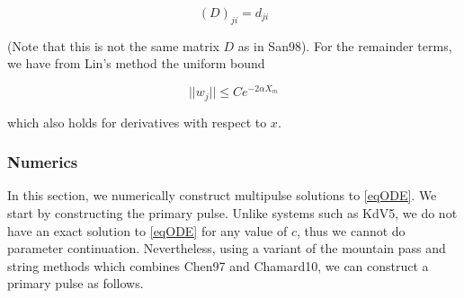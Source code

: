 \documentclass[12pt]{article}
\begin{document}
\begin{equation}\label{matrixD}
(D)_{ji} = d_{ji}
\end{equation}

(Note that this is not the same matrix $D$ as in San98). For the remainder terms, we have from Lin's method the uniform bound

\begin{equation}\label{sjwbound}
||w_j|| \leq C e^{-2 \alpha X_m}
\end{equation}

which also holds for derivatives with respect to $x$.

\subsubsection{Numerics}

In this section, we numerically construct multipulse solutions to \eqref{eqODE}. We start by constructing the primary pulse. Unlike systems such as KdV5, we do not have an exact solution to \eqref{eqODE} for any value of $c$, thus we cannot do parameter continuation. Nevertheless, using a variant of the mountain pass and string methods which combines Chen97 and Chamard10, we can construct a primary pulse as follows.
\end{document}
